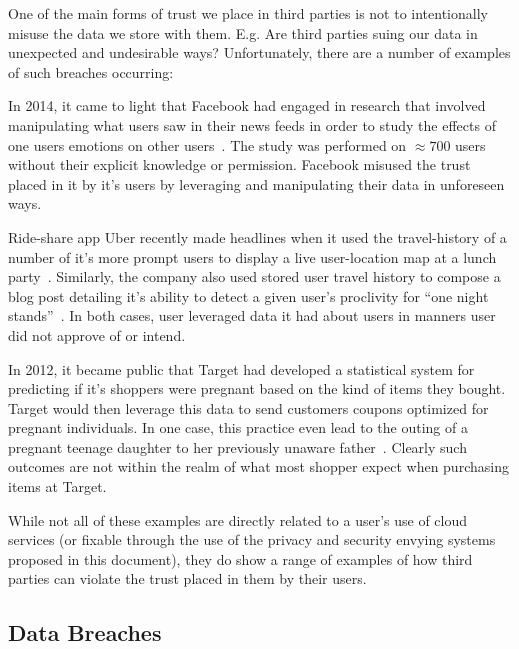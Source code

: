 One of the main forms of trust we place in third parties is not to
intentionally misuse the data we store with them. E.g. Are third
parties suing our data in unexpected and undesirable ways?
Unfortunately, there are a number of examples of such breaches
occurring:

\begin{packed_desc}
\item[Facebook Emotional Contagion Study:] In 2014, it came to light
  that Facebook had engaged in research that involved manipulating
  what users saw in their news feeds in order to study the effects of
  one users emotions on other users~\cite{Goel2014}. The study was
  performed on $\approx700$ users without their explicit knowledge or
  permission. Facebook misused the trust placed in it by it's users by
  leveraging and manipulating their data in unforeseen ways.
\item[Uber User Travel History:] Ride-share app Uber recently made
  headlines when it used the travel-history of a number of it's more
  prompt users to display a live user-location map at a lunch
  party~\cite{Sims2014}. Similarly, the company also used stored user
  travel history to compose a blog post detailing it's ability to
  detect a given user's proclivity for ``one night
  stands''~\cite{Pagliery2014}. In both cases, user leveraged data it
  had about users in manners user did not approve of or intend.
\item[Target Pregnancy Prediction:] In 2012, it became public that
  Target had developed a statistical system for predicting if it's
  shoppers were pregnant based on the kind of items they
  bought. Target would then leverage this data to send customers
  coupons optimized for pregnant individuals. In one case, this
  practice even lead to the outing of a pregnant teenage daughter to
  her previously unaware father~\cite{Hill2012}. Clearly such outcomes
  are not within the realm of what most shopper expect when purchasing
  items at Target.
\end{packed_desc}

While not all of these examples are directly related to a user's use
of cloud services (or fixable through the use of the privacy and
security envying systems proposed in this document), they do show a
range of examples of how third parties can violate the trust placed in
them by their users.

\subsection{Data Breaches}

